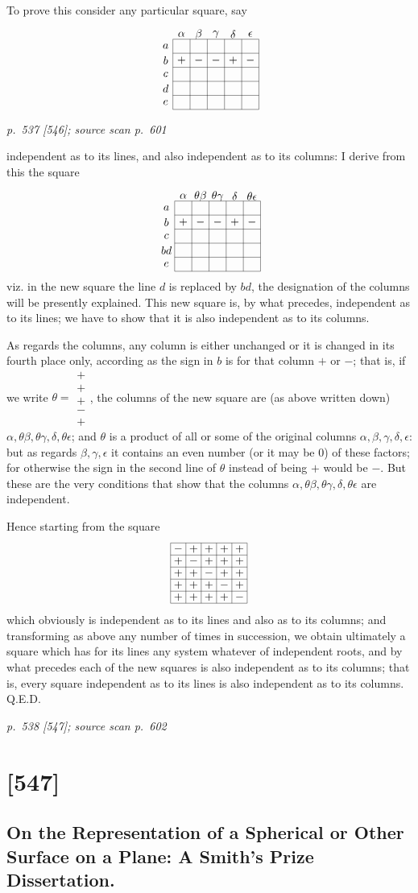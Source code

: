 \documentclass[11pt,a4paper]{article}
\newcommand{\sourcepage}[3]{%
  \bigskip
  \noindent\textit{p.~#1 [#2]; source scan p.~#3}%
  \par\smallskip
}
\newcommand{\signsquareone}{%
\begin{tikzpicture}[baseline=(current bounding box.center), x=0.54cm, y=0.44cm]
  \foreach \i in {0,...,5} {
    \draw[line width=0.3pt] (\i,0) -- (\i,5);
    \draw[line width=0.3pt] (0,\i) -- (5,\i);
  }
  \node at (-0.42,4.5) {$a$};
  \node at (-0.42,3.5) {$b$};
  \node at (-0.42,2.5) {$c$};
  \node at (-0.42,1.5) {$d$};
  \node at (-0.42,0.5) {$e$};
  \node at (0.5,5.35) {$\alpha$};
  \node at (1.5,5.35) {$\beta$};
  \node at (2.5,5.35) {$\gamma$};
  \node at (3.5,5.35) {$\delta$};
  \node at (4.5,5.35) {$\epsilon$};
  \node at (0.5,3.5) {$+$};
  \node at (1.5,3.5) {$-$};
  \node at (2.5,3.5) {$-$};
  \node at (3.5,3.5) {$+$};
  \node at (4.5,3.5) {$-$};
\end{tikzpicture}%
}
\newcommand{\signsquaretwo}{%
\begin{tikzpicture}[baseline=(current bounding box.center), x=0.54cm, y=0.44cm]
  \foreach \i in {0,...,5} {
    \draw[line width=0.3pt] (\i,0) -- (\i,5);
    \draw[line width=0.3pt] (0,\i) -- (5,\i);
  }
  \node at (-0.48,4.5) {$a$};
  \node at (-0.48,3.5) {$b$};
  \node at (-0.48,2.5) {$c$};
  \node at (-0.48,1.5) {$bd$};
  \node at (-0.48,0.5) {$e$};
  \node at (0.5,5.35) {$\alpha$};
  \node at (1.5,5.35) {$\theta\beta$};
  \node at (2.5,5.35) {$\theta\gamma$};
  \node at (3.5,5.35) {$\delta$};
  \node at (4.5,5.35) {$\theta\epsilon$};
  \node at (0.5,3.5) {$+$};
  \node at (1.5,3.5) {$-$};
  \node at (2.5,3.5) {$-$};
  \node at (3.5,3.5) {$+$};
  \node at (4.5,3.5) {$-$};
\end{tikzpicture}%
}
\newcommand{\diagonalsquare}{%
\begin{tikzpicture}[baseline=(current bounding box.center), x=0.48cm, y=0.38cm]
  \foreach \i in {0,...,5} {
    \draw[line width=0.3pt] (\i,0) -- (\i,5);
    \draw[line width=0.3pt] (0,\i) -- (5,\i);
  }
  \foreach \r in {0,...,4} {
    \foreach \c in {0,...,4} {
      \pgfmathtruncatemacro{\same}{ifthenelse(\r==\c,1,0)}
      \ifnum\same=1
        \node at (\c+0.5,4.5-\r) {$-$};
      \else
        \node at (\c+0.5,4.5-\r) {$+$};
      \fi
    }
  }
\end{tikzpicture}%
}
\begin{document}
To prove this consider any particular square, say
\[
\signsquareone
\]

\clearpage

\sourcepage{537}{546}{601}
independent as to its lines, and also independent as to its columns: I derive
from this the square
\[
\signsquaretwo
\]
viz. in the new square the line $d$ is replaced by $bd$, the designation of
the columns will be presently explained. This new square is, by what
precedes, independent as to its lines; we have to show that it is also
independent as to its columns.

As regards the columns, any column is either unchanged or it is changed in
its fourth place only, according as the sign in $b$ is for that column $+$ or
$-$; that is, if we write
$\theta=
\begin{matrix}
+\\ +\\ +\\ -\\ +
\end{matrix}$, the columns of the new square are (as above written down)
$\alpha,\theta\beta,\theta\gamma,\delta,\theta\epsilon$; and $\theta$ is a
product of all or some of the original columns $\alpha,\beta,\gamma,\delta,
\epsilon$: but as regards $\beta,\gamma,\epsilon$ it contains an even number
(or it may be 0) of these factors; for otherwise the sign in the second line
of $\theta$ instead of being $+$ would be $-$. But these are the very
conditions that show that the columns
$\alpha,\theta\beta,\theta\gamma,\delta,\theta\epsilon$ are independent.

Hence starting from the square
\[
\diagonalsquare
\]
which obviously is independent as to its lines and also as to its columns;
and transforming as above any number of times in succession, we obtain
ultimately a square which has for its lines any system whatever of
independent roots, and by what precedes each of the new squares is also
independent as to its columns; that is, every square independent as to its
lines is also independent as to its columns. \quad Q.E.D.

\clearpage

\sourcepage{538}{547}{602}
\section{[547]}
\subsection{On the Representation of a Spherical or Other Surface on a Plane: A Smith's Prize Dissertation.}
\end{document}
